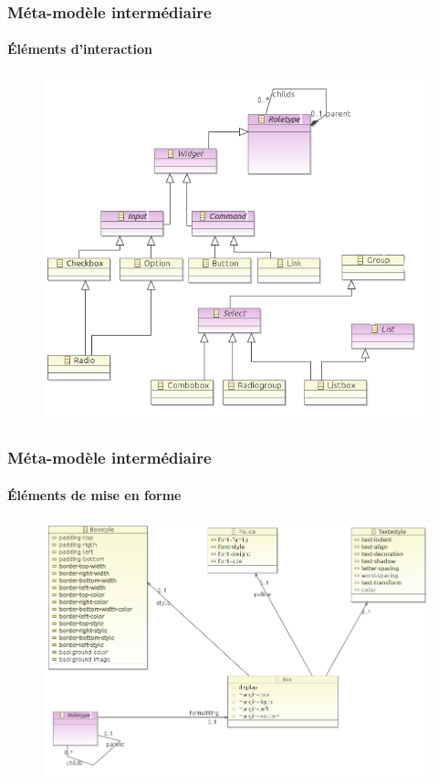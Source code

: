 \documentclass[9pt]{beamer}
\begin{document}
\begin{frame}
\frametitle{Méta-modèle intermédiaire}
\framesubtitle{Éléments d'interaction}
\begin{figure}
\centering
\includegraphics[scale=0.4]{img/metamodele_widget.png}
\end{figure}
\end{frame}

\begin{frame}
\frametitle{Méta-modèle intermédiaire}
\framesubtitle{Éléments de mise en forme}
\begin{figure}
\centering
\includegraphics[scale=0.4]{img/metamodele_CSS.png}
\end{figure}
\end{frame}
\end{document}
